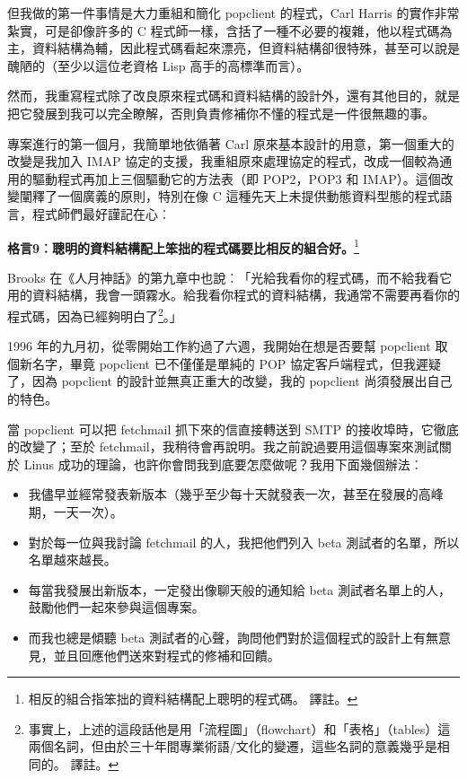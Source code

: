 \documentclass[12pt,]{article}
\makeatletter
\newcommand*{\shifttext}[2]{%
  \settowidth{\@tempdima}{#2}%
  \makebox[\@tempdima]{\hspace*{#1}#2}%
}
\makeatother
\begin{document}
但我做的第一件事情是大力重組和簡化 popclient 的程式，Carl Harris
的實作非常紮實，可是卻像許多的 C
程式師一樣，含括了一種不必要的複雜，他以程式碼為主，資料結構為輔，因此程式碼看起來漂亮，但資料結構卻很特殊，甚至可以說是醜陋的（至少以這位老資格
Lisp 高手的高標準而言）。

然而，我重寫程式除了改良原來程式碼和資料結構的設計外，還有其他目的，就是把它發展到我可以完全瞭解，否則負責修補你不懂的程式是一件很無趣的事。

專案進行的第一個月，我簡單地依循著 Carl
原來基本設計的用意，第一個重大的改變是我加入 IMAP
協定的支援，我重組原來處理協定的程式，改成一個較為通用的驅動程式再加上三個驅動它的方法表（即
POP2，POP3 和 IMAP）。這個改變闡釋了一個廣義的原則，特別在像 C
這種先天上未提供動態資料型態的程式語言，程式師們最好謹記在心︰

\textbf{格言9︰聰明的資料結構配上笨拙的程式碼要比相反的組合好。}\footnote{相反的組合指笨拙的資料結構配上聰明的程式碼。
  \shifttext{1pt}{---}\shifttext{-1pt}{---} 譯註。}

Brooks
在《人月神話》的第九章中也說︰「光給我看你的程式碼，而不給我看它用的資料結構，我會一頭霧水。給我看你程式的資料結構，我通常不需要再看你的程式碼，因為已經夠明白了\footnote{事實上，上述的這段話他是用「流程圖」（flowchart）和「表格」（tables）這兩個名詞，但由於三十年間專業術語/文化的變遷，這些名詞的意義幾乎是相同的。
  \shifttext{1pt}{---}\shifttext{-1pt}{---} 譯註。}。」

1996 年的九月初，從零開始工作約過了六週，我開始在想是否要幫 popclient
取個新名字，畢竟 popclient 已不僅僅是單純的 POP
協定客戶端程式，但我遲疑了，因為 popclient 的設計並無真正重大的改變，我的
popclient 尚須發展出自己的特色。

當 popclient 可以把 fetchmail 抓下來的信直接轉送到 SMTP
的接收埠時，它徹底的改變了；至於
fetchmail，我稍待會再說明。我之前說過要用這個專案來測試關於 Linus
成功的理論，也許你會問我到底要怎麼做呢？我用下面幾個辦法︰

\begin{itemize}
\item
  我儘早並經常發表新版本（幾乎至少每十天就發表一次，甚至在發展的高峰期，一天一次）。
\item
  對於每一位與我討論 fetchmail 的人，我把他們列入 beta
  測試者的名單，所以名單越來越長。
\item
  每當我發展出新版本，一定發出像聊天般的通知給 beta
  測試者名單上的人，鼓勵他們一起來參與這個專案。
\item
  而我也總是傾聽 beta
  測試者的心聲，詢問他們對於這個程式的設計上有無意見，並且回應他們送來對程式的修補和回饋。
\end{itemize}
\end{document}
